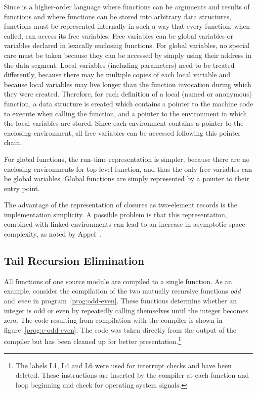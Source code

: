 Since \turtle{} is a higher-order language where functions can be
arguments and results of functions and where functions can be stored
into arbitrary data structures, functions must be represented
internally in such a way that every function, when called, can access
its free variables.  Free variables can be global variables or
variables declared in lexically enclosing functions.  For global
variables, no special care must be taken because they can be accessed
by simply using their address in the data segment.  Local variables
(including parameters) need to be treated differently, because there
may be multiple copies of each local variable and because local
variables may live longer than the function invocation during which
they were created.  Therefore, for each definition of a local (named
or anonymous) function, a data structure is created which contains a
pointer to the machine code to execute when calling the function, and
a pointer to the environment in which the local variables are stored.
Since each environment contains a pointer to the enclosing
environment, all free variables can be accessed following this pointer
chain.

For global functions, the run-time representation is simpler, because
there are no enclosing environments for top-level function, and thus
the only free variables can be global variables.  Global functions are
simply represented by a pointer to their entry point.

%
The advantage of the representation of closures as two-element records
is the implementation simplicity.  A possible problem is that this
representation, combined with linked environments can lead to an
increase in asymptotic space complexity, as noted by
Appel~\cite{appel92compilingwithcontinuations}.

\subsection{Tail Recursion Elimination}
\label{sec:tail-recursion-elimination}

%
All functions of one source module are compiled to a single \cee{}
function. As an example, consider the compilation of the two mutually
recursive functions {\em odd} and {\em even} in
program~\ref{prog:odd-even}.  These functions determine whether an
integer is odd or even by repeatedly calling themselves until the
integer becomes zero.  The \cee{} code resulting from compilation with
the \turtle{} compiler is shown in figure~\ref{prog:c-odd-even}.  The
code was taken directly from the output of the compiler but has been
cleaned up for better presentation.\footnote{The labels L1, L4 and L6
  were used for interrupt checks and have been deleted.  These
  instructions are inserted by the compiler at each function and loop
  beginning and check for operating system signals.}


